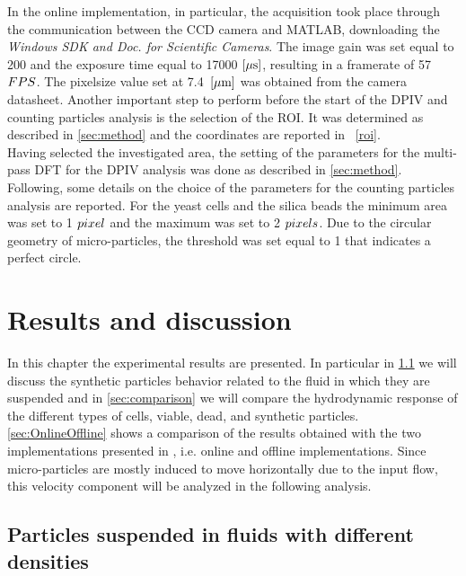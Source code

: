 \documentclass[journal]{IEEEtran}
\theoremstyle{definition}
\theoremstyle{remark}
\begin{document}
In the online implementation, in particular, the acquisition took place through the communication between the CCD camera and MATLAB, downloading the \textit{Windows SDK and Doc. for Scientific Cameras}.
The image gain was set equal to 200 and the exposure time equal to 17000 $[\rm\mu s]$, resulting in a framerate of 57 $FPS$. The pixelsize value set at 7.4~$[\rm\mu m]$ was obtained from the camera datasheet.
Another important step to perform before the start of the DPIV and
counting particles analysis is the selection of the ROI.
It was determined as described in \sect\ref{sec:method} and the coordinates are reported in ~\tab\ref{roi}. 
\\Having selected the investigated area, the setting of the parameters for the multi-pass DFT for the DPIV analysis was done as described in \sect\ref{sec:method}. Following, some details on the choice of the parameters for the counting particles analysis are reported. For the yeast cells and the silica beads the minimum area was set to 1 $pixel$ and the maximum was set to 2 $pixels$. Due to the circular geometry of micro-particles, the threshold was set equal to 1 that indicates a perfect circle.

\section{Results and discussion}
In this chapter the experimental results are presented. In particular in \sect\ref{sec:suspended-particles} we will discuss the synthetic particles behavior related to the fluid in which they are suspended and in \sect\ref{sec:comparison} we will compare the hydrodynamic response of the different types of cells, viable, dead, and synthetic particles. \sect\ref{sec:OnlineOffline} shows a comparison of the results obtained with the two implementations presented in \sect{\ref{sec:method}}, i.e. online and offline implementations.
Since micro-particles are mostly induced to move horizontally due to the input flow, this velocity component will be analyzed in the following analysis.


\subsection{Particles suspended in fluids with different densities}\label{sec:suspended-particles}
\end{document}
